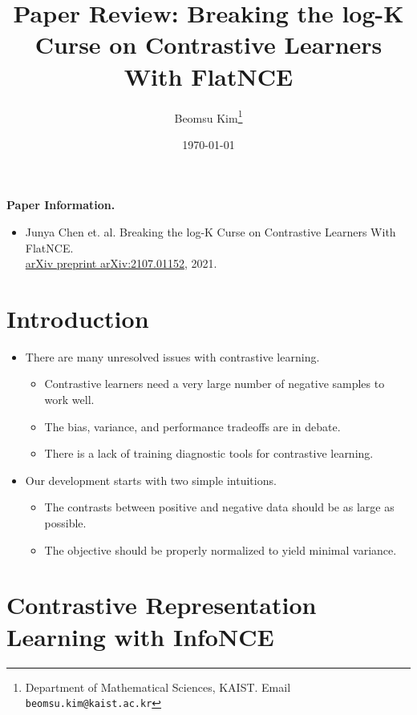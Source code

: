 \documentclass[10pt]{article}
\title{Paper Review: Breaking the log-K Curse on Contrastive Learners With FlatNCE}
\author{Beomsu Kim\footnote{Department of Mathematical Sciences, KAIST. Email \texttt{beomsu.kim@kaist.ac.kr}}}
\date{\today}
\begin{document}
\maketitle

\textbf{Paper Information.}

\begin{itemize}
\item Junya Chen et. al. Breaking the log-K Curse on Contrastive Learners With FlatNCE. \\ \underline{arXiv preprint arXiv:2107.01152}, 2021.
\end{itemize}

\section{Introduction}

\begin{itemize}
\item There are many unresolved issues with contrastive learning.
\begin{itemize}
\item Contrastive learners need a very large number of negative samples to work well.
\item The bias, variance, and performance tradeoffs are in debate.
\item There is a lack of training diagnostic tools for contrastive learning.
\end{itemize}
\item Our development starts with two simple intuitions.
\begin{itemize}
\item The contrasts between positive and negative data should be as large as possible.
\item The objective should be properly normalized to yield minimal variance.
\end{itemize}
\end{itemize}

\newpage

\section{Contrastive Representation Learning with InfoNCE}
\end{document}
